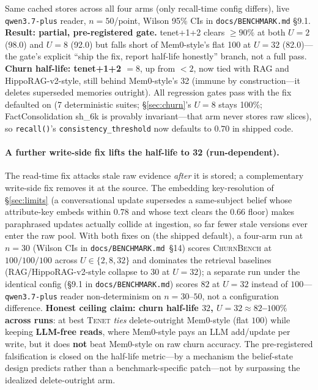\documentclass[11pt]{article}
\newcommand{\tenet}{\textsc{Tenet}}
\begin{document}
Same cached stores across all four arms (only recall-time config differs), live
\texttt{qwen3.7-plus} reader, $n{=}50$/point, Wilson 95\% CIs in
\texttt{docs/BENCHMARK.md} \S9.1. \textbf{Result: partial, pre-registered gate.}
tenet+1+2 clears $\geq90\%$ at both $U{=}2$ (98.0) and $U{=}8$ (92.0) but falls short
of Mem0-style's flat 100 at $U{=}32$ (82.0)---the gate's explicit ``ship the fix,
report half-life honestly'' branch, not a full pass. \textbf{Churn half-life:
tenet+1+2 $=8$}, up from $<2$, now tied with RAG and HippoRAG-v2-style, still behind
Mem0-style's 32 (immune by construction---it deletes superseded memories outright).
All regression gates pass with the fix defaulted on (7 deterministic suites;
\S\ref{sec:churn}'s $U{=}8$ stays 100\%; FactConsolidation sh\_6k is provably
invariant---that arm never stores raw slices), so \texttt{recall()}'s
\texttt{consistency\_threshold} now defaults to $0.70$ in shipped code.

\paragraph{A further write-side fix lifts the half-life to 32 (run-dependent).} The
read-time fix attacks stale raw evidence \emph{after} it is stored; a complementary
write-side fix removes it at the source. The embedding key-resolution of
\S\ref{sec:limits} (a conversational update supersedes a same-subject belief whose
attribute-key embeds within $0.78$ and whose text clears the $0.66$ floor) makes
paraphrased updates actually collide at ingestion, so far fewer stale versions ever enter
the raw pool. With both fixes on (the shipped default), a four-arm run at $n{=}30$
(Wilson CIs in \texttt{docs/BENCHMARK.md}~\S14) scores \textsc{ChurnBench} at
$100/100/100$ across $U{\in}\{2,8,32\}$ and dominates the retrieval baselines
(RAG/HippoRAG-v2-style collapse to $30$ at $U{=}32$); a separate run under the identical
config (\S9.1 in \texttt{docs/BENCHMARK.md}) scores $82$ at $U{=}32$ instead of
$100$---\texttt{qwen3.7-plus} reader non-determinism on $n{=}30$--$50$, not a
configuration difference. \textbf{Honest ceiling claim: churn half-life $32$,
$U{=}32 \approx 82$--$100\%$ across runs}: at best \tenet{} \emph{ties} delete-outright
Mem0-style (flat $100$) while keeping \textbf{LLM-free reads}, where Mem0-style pays an
LLM add/update per write, but it does \textbf{not} beat Mem0-style on raw churn accuracy.
The pre-registered falsification is closed on the half-life metric---by a mechanism the
belief-state design predicts rather than a benchmark-specific patch---not by surpassing
the idealized delete-outright arm.
\end{document}
